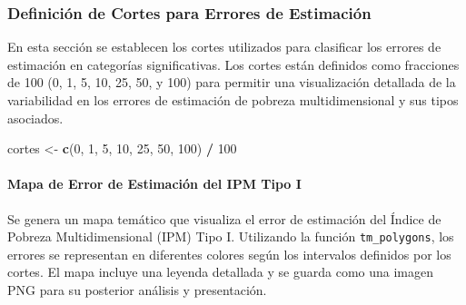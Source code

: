 \documentclass[
  12pt,
]{book}
\newenvironment{Shaded}{\begin{snugshade}}{\end{snugshade}}
\newcommand{\DecValTok}[1]{\textcolor[rgb]{0.00,0.00,0.81}{#1}}
\newcommand{\FunctionTok}[1]{\textcolor[rgb]{0.13,0.29,0.53}{\textbf{#1}}}
\newcommand{\NormalTok}[1]{#1}
\newcommand{\OtherTok}[1]{\textcolor[rgb]{0.56,0.35,0.01}{#1}}
\newcommand{\SpecialCharTok}[1]{\textcolor[rgb]{0.81,0.36,0.00}{\textbf{#1}}}
\begin{document}
\hypertarget{definiciuxf3n-de-cortes-para-errores-de-estimaciuxf3n}{%
\subsubsection*{Definición de Cortes para Errores de Estimación}\label{definiciuxf3n-de-cortes-para-errores-de-estimaciuxf3n}}

En esta sección se establecen los cortes utilizados para clasificar los errores de estimación en categorías significativas. Los cortes están definidos como fracciones de 100 (0, 1, 5, 10, 25, 50, y 100) para permitir una visualización detallada de la variabilidad en los errores de estimación de pobreza multidimensional y sus tipos asociados.

\begin{Shaded}
\begin{Highlighting}[]
\NormalTok{cortes }\OtherTok{\textless{}{-}} \FunctionTok{c}\NormalTok{(}\DecValTok{0}\NormalTok{, }\DecValTok{1}\NormalTok{, }\DecValTok{5}\NormalTok{, }\DecValTok{10}\NormalTok{, }\DecValTok{25}\NormalTok{, }\DecValTok{50}\NormalTok{, }\DecValTok{100}\NormalTok{) }\SpecialCharTok{/} \DecValTok{100}
\end{Highlighting}
\end{Shaded}

\hypertarget{mapa-de-error-de-estimaciuxf3n-del-ipm-tipo-i}{%
\paragraph{Mapa de Error de Estimación del IPM Tipo I}\label{mapa-de-error-de-estimaciuxf3n-del-ipm-tipo-i}}

Se genera un mapa temático que visualiza el error de estimación del Índice de Pobreza Multidimensional (IPM) Tipo I. Utilizando la función \texttt{tm\_polygons}, los errores se representan en diferentes colores según los intervalos definidos por los cortes. El mapa incluye una leyenda detallada y se guarda como una imagen PNG para su posterior análisis y presentación.
\end{document}
